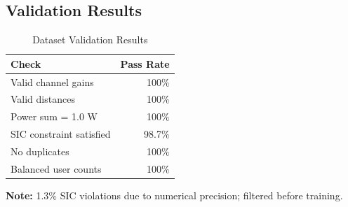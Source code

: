 \subsection{Validation Results}

\begin{table}[H]
\centering
\begin{tabular}{lr}
\toprule
\textbf{Check} & \textbf{Pass Rate} \\
\midrule
Valid channel gains & 100\% \\
Valid distances & 100\% \\
Power sum = 1.0 W & 100\% \\
SIC constraint satisfied & 98.7\% \\
No duplicates & 100\% \\
Balanced user counts & 100\% \\
\bottomrule
\end{tabular}
\caption{Dataset Validation Results}
\end{table}

\textbf{Note:} 1.3\% SIC violations due to numerical precision; filtered before training.
